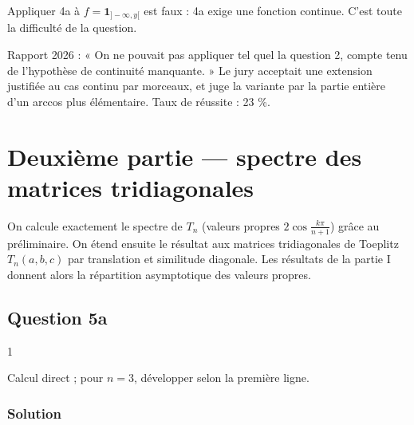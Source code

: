 \documentclass[11pt,a4paper]{article}
\newcommand{\equationajustee}[1]{%
  \sbox{\boiteequation}{$\displaystyle #1$}%
  \ifdim\wd\boiteequation>\linewidth
    \[\resizebox{\linewidth}{!}{\usebox{\boiteequation}}\]%
  \else
    \[#1\]%
  \fi}
\begin{document}
\begin{piege}

Appliquer 4a à \(f=\mathbf 1_{]-\infty,y[}\) est faux : 4a exige une fonction continue. C'est toute la difficulté de la question.

\end{piege}

\begin{jury}

Rapport 2026 : « On ne pouvait pas appliquer tel quel la question 2, compte tenu de l'hypothèse de continuité manquante. » Le jury acceptait une extension justifiée au cas continu par morceaux, et juge la variante par la partie entière d'un arccos plus élémentaire. Taux de réussite : 23 \%.

\end{jury}

\hypertarget{deuxiuxe8me-partie-spectre-des-matrices-tridiagonales}{%
\section{Deuxième partie --- spectre des matrices tridiagonales}\label{deuxiuxe8me-partie-spectre-des-matrices-tridiagonales}}

On calcule exactement le spectre de \(T_n\) (valeurs propres \(2\cos\frac{k\pi}{n+1}\)) grâce au préliminaire. On étend ensuite le résultat aux matrices tridiagonales de Toeplitz \(T_n(a,b,c)\) par translation et similitude diagonale. Les résultats de la partie I donnent alors la répartition asymptotique des valeurs propres.

\hypertarget{question-5a}{%
\subsection{Question 5a}\label{question-5a}}

\begin{indication}{1}

Calcul direct ; pour \(n=3\), développer selon la première ligne.

\end{indication}

\hypertarget{solution-7}{%
\subsubsection{Solution}\label{solution-7}}

\equationajustee{\chi_2(X)=\det\begin{pmatrix}X&-1\\-1&X\end{pmatrix}=X^2-1.}
\end{document}
